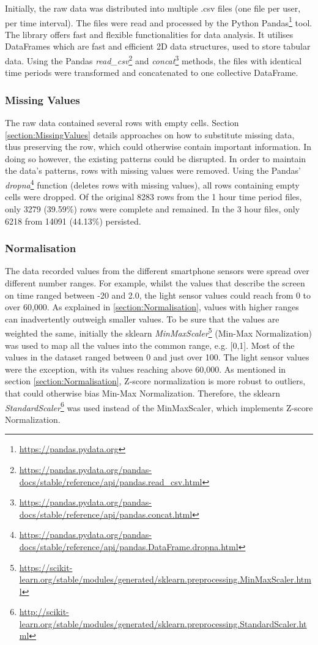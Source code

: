 Initially, the raw data was distributed into multiple .csv files (one file per user, per time interval). The files were read and processed by the Python Pandas\footnote{\url{https://pandas.pydata.org}} tool. The library offers fast and flexible functionalities for data analysis. It utilises DataFrames which are fast and efficient 2D data structures, used to store tabular data. Using the Pandas \textit{read\_csv}\footnote{\url{https://pandas.pydata.org/pandas-docs/stable/reference/api/pandas.read_csv.html}} and \textit{concat}\footnote{\url{https://pandas.pydata.org/pandas-docs/stable/reference/api/pandas.concat.html}} methods, the files with identical time periods were transformed and concatenated to one collective DataFrame. 


\subsubsection{Missing Values}
The raw data contained several rows with empty cells. Section \ref{section:MissingValues} details approaches on how to substitute missing data, thus preserving the row, which could otherwise contain important information. In doing so however, the existing patterns could be disrupted. In order to maintain the data's patterns, rows with missing values were removed. Using the Pandas' \textit{dropna}\footnote{\url{https://pandas.pydata.org/pandas-docs/stable/reference/api/pandas.DataFrame.dropna.html}} function (deletes rows with missing values), all rows containing empty cells were dropped. Of the original 8283 rows from the 1 hour time period files, only 3279 (39.59\%) rows were complete and remained. In the 3 hour files, only 6218 from 14091 (44.13\%) persisted.

\subsubsection{Normalisation}
The data recorded values from the different smartphone sensors were spread over different number ranges. For example, whilst the values that describe the screen on time ranged between -20 and 2.0, the light sensor values could reach from 0 to over 60,000. As explained in \ref{section:Normalisation}, values with higher ranges can inadvertently outweigh smaller values. To be sure that the values are weighted the same, initially the sklearn \textit{MinMaxScaler}\footnote{\url{https://scikit-learn.org/stable/modules/generated/sklearn.preprocessing.MinMaxScaler.html}} (Min-Max Normalization) was used to map all the values into the common range, e.g. [0,1]. Most of the values in the dataset ranged between 0 and just over 100. The light sensor values were the exception, with its values reaching above 60,000. As mentioned in section \ref{section:Normalisation}, Z-score normalization is more robust to outliers, that could otherwise bias Min-Max Normalization. Therefore, the sklearn \textit{StandardScaler}\footnote{\url{http://scikit-learn.org/stable/modules/generated/sklearn.preprocessing.StandardScaler.html}} was used instead of the MinMaxScaler, which implements Z-score Normalization.

